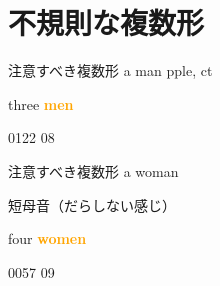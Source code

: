 \documentclass[aspectratio=169,xcolor={dvipsnames,table}]{beamer}
\newcommand{\myaudio}[1]{\href{#1}{\faVolumeUp}}
\begin{document}
\section{不規則な複数形}
\begin{frame}[plain]{注意すべき複数形}
  \scalebox{5}{\ManFace}\hspace{15pt}
  \pause
  {\LARGE a man}\pause{}
  \pause
  \hfill{\textipa{/\ae /}} pple, ct\pause

  \bigskip

  \bigskip

  \scalebox{5}{\ManFace\hspace{5pt}\ManFace\hspace{5pt}\ManFace}\hspace{15pt}
  \pause
  {\LARGE three  \textcolor{orange}{\bfseries men}}\pause{}

  \bigskip

  \bigskip

  \mbox{}\hfill{\tiny 0122}\,{\scriptsize \myaudio{./audio/005_singular_plural_08.mp3}}\,{\tiny 08}
\end{frame}
\begin{frame}[plain]{注意すべき複数形}
  \scalebox{5}{\WomanFace}\pause\hspace{15pt} {\LARGE a woman}%
  \pause{}
  \pause
  \hfill{\scriptsize {}}

  \hfill{\scriptsize 短母音（だらしない感じ）}\pause

  \bigskip

  \bigskip

  \scalebox{5}{\WomanFace \WomanFace \WomanFace \WomanFace} \hspace{25pt}
  \pause
  {\LARGE four  \textcolor{orange}{\bfseries women}}%
  \pause{}%


  \bigskip

  \bigskip

  \mbox{}\hfill{\tiny 0057}\,{\scriptsize \myaudio{./audio/005_singular_plural_09.mp3}}\,{\tiny 09}
\end{frame}
\end{document}
